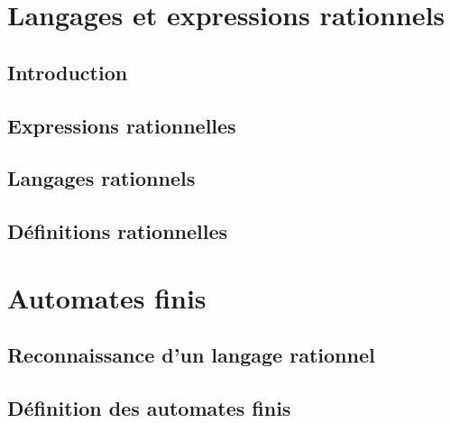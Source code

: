 
\section{Langages et expressions rationnels}
 
\subsection{Introduction}



 
\subsection{Expressions rationnelles}



 
\subsection{Langages rationnels}




 
\subsection{Définitions rationnelles}


 
\section{Automates finis}
 
\subsection{Reconnaissance d'un langage rationnel}




 
\subsection{Définition des automates finis}





 
